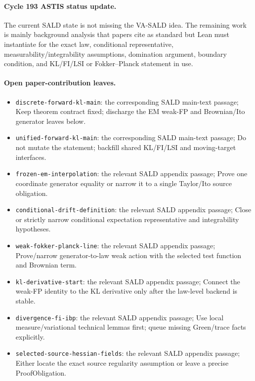 \paragraph{Cycle 193 ASTIS status update.}
The current SALD state is not missing the VA-SALD idea.  The remaining work is mainly background analysis that papers cite as standard but Lean must instantiate for the exact law, conditional representative, measurability/integrability assumptions, domination argument, boundary condition, and KL/FI/LSI or Fokker--Planck statement in use.

\paragraph{Open paper-contribution leaves.}
\begin{itemize}
\item \texttt{discrete-forward-kl-main}: the corresponding SALD main-text passage; Keep theorem contract fixed; discharge the EM weak-FP and Brownian/Ito generator leaves below.
\item \texttt{unified-forward-kl-main}: the corresponding SALD main-text passage; Do not mutate the statement; backfill shared KL/FI/LSI and moving-target interfaces.
\item \texttt{frozen-em-interpolation}: the relevant SALD appendix passage; Prove one coordinate generator equality or narrow it to a single Taylor/Ito source obligation.
\item \texttt{conditional-drift-definition}: the relevant SALD appendix passage; Close or strictly narrow conditional expectation representative and integrability hypotheses.
\item \texttt{weak-fokker-planck-line}: the relevant SALD appendix passage; Prove/narrow generator-to-law weak action with the selected test function and Brownian term.
\item \texttt{kl-derivative-start}: the relevant SALD appendix passage; Connect the weak-FP identity to the KL derivative only after the law-level backend is stable.
\item \texttt{divergence-fi-ibp}: the relevant SALD appendix passage; Use local measure/variational technical lemmas first; queue missing Green/trace facts explicitly.
\item \texttt{selected-source-hessian-fields}: the relevant SALD appendix passage; Either locate the exact source regularity assumption or leave a precise ProofObligation.
\end{itemize}

